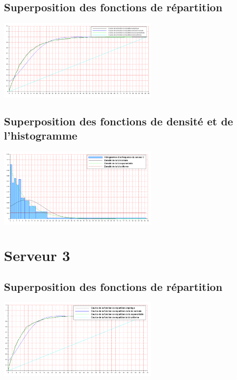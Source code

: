 \documentclass{article}
\begin{document}
\subsection{Superposition des fonctions de répartition}
\begin{center}
\includegraphics[width=300px]{img/S2_repartitions.png}
\end{center}
\paragraph{}

\subsection{Superposition des fonctions de densité et de l'histogramme}
\begin{center}
\includegraphics[width=300px]{img/S2_densite.png}
\end{center}
\paragraph{}

\section{Serveur 3}

\subsection{Superposition des fonctions de répartition}
\begin{center}
\includegraphics[width=300px]{img/S3_repartitions.png}
\end{center}
\end{document}

